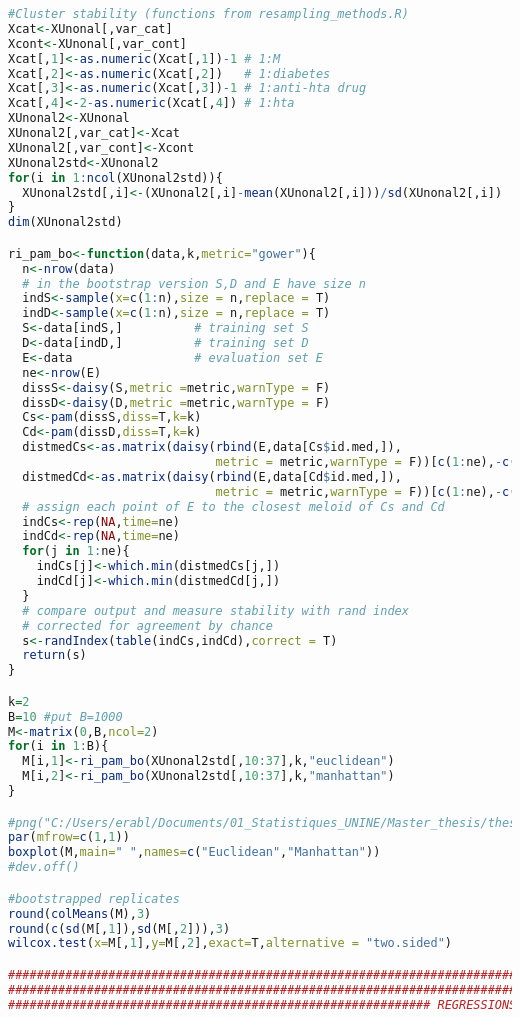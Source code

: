 \documentclass[a4paper]{book}
\begin{document}
\begin{lstlisting}[language=R]
#Cluster stability (functions from resampling_methods.R)
Xcat<-XUnonal[,var_cat]
Xcont<-XUnonal[,var_cont]
Xcat[,1]<-as.numeric(Xcat[,1])-1 # 1:M
Xcat[,2]<-as.numeric(Xcat[,2])   # 1:diabetes
Xcat[,3]<-as.numeric(Xcat[,3])-1 # 1:anti-hta drug
Xcat[,4]<-2-as.numeric(Xcat[,4]) # 1:hta
XUnonal2<-XUnonal
XUnonal2[,var_cat]<-Xcat
XUnonal2[,var_cont]<-Xcont
XUnonal2std<-XUnonal2
for(i in 1:ncol(XUnonal2std)){
  XUnonal2std[,i]<-(XUnonal2[,i]-mean(XUnonal2[,i]))/sd(XUnonal2[,i])
}
dim(XUnonal2std)

ri_pam_bo<-function(data,k,metric="gower"){
  n<-nrow(data)
  # in the bootstrap version S,D and E have size n
  indS<-sample(x=c(1:n),size = n,replace = T)
  indD<-sample(x=c(1:n),size = n,replace = T)
  S<-data[indS,]          # training set S
  D<-data[indD,]          # training set D
  E<-data                 # evaluation set E
  ne<-nrow(E)
  dissS<-daisy(S,metric =metric,warnType = F)
  dissD<-daisy(D,metric =metric,warnType = F)
  Cs<-pam(dissS,diss=T,k=k)
  Cd<-pam(dissD,diss=T,k=k)
  distmedCs<-as.matrix(daisy(rbind(E,data[Cs$id.med,]),
                             metric = metric,warnType = F))[c(1:ne),-c(1:ne)]
  distmedCd<-as.matrix(daisy(rbind(E,data[Cd$id.med,]),
                             metric = metric,warnType = F))[c(1:ne),-c(1:ne)]
  # assign each point of E to the closest meloid of Cs and Cd
  indCs<-rep(NA,time=ne)
  indCd<-rep(NA,time=ne)
  for(j in 1:ne){
    indCs[j]<-which.min(distmedCs[j,])
    indCd[j]<-which.min(distmedCd[j,])
  }
  # compare output and measure stability with rand index
  # corrected for agreement by chance
  s<-randIndex(table(indCs,indCd),correct = T)
  return(s)
}

k=2
B=10 #put B=1000
M<-matrix(0,B,ncol=2)
for(i in 1:B){
  M[i,1]<-ri_pam_bo(XUnonal2std[,10:37],k,"euclidean")
  M[i,2]<-ri_pam_bo(XUnonal2std[,10:37],k,"manhattan")
}

#png("C:/Users/erabl/Documents/01_Statistiques_UNINE/Master_thesis/thesis2/figures/stabmetric.png",width = 404,height = 404)
par(mfrow=c(1,1))
boxplot(M,main=" ",names=c("Euclidean","Manhattan"))
#dev.off()

#bootstrapped replicates
round(colMeans(M),3)
round(c(sd(M[,1]),sd(M[,2])),3)
wilcox.test(x=M[,1],y=M[,2],exact=T,alternative = "two.sided")

#######################################################################
#######################################################################
########################################################### REGRESSIONS


\end{lstlisting}
\end{document}
